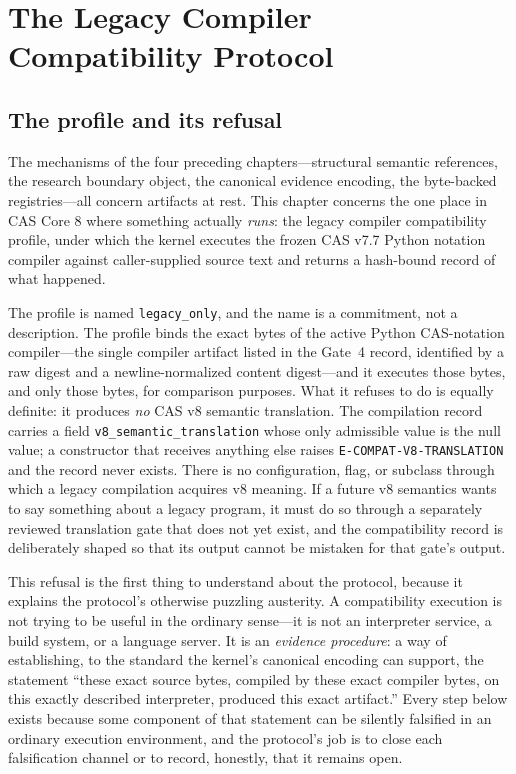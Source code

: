 \chapter{The Legacy Compiler Compatibility Protocol}\label{ch07:worker-protocol}

\section{The profile and its refusal}\label{ch07:profile}

The mechanisms of the four preceding chapters---structural semantic references, the research boundary object, the canonical evidence encoding, the byte-backed registries---all concern artifacts at rest. This chapter concerns the one place in CAS Core 8 where something actually \emph{runs}: the legacy compiler compatibility profile, under which the kernel executes the frozen CAS v7.7 Python notation compiler against caller-supplied source text and returns a hash-bound record of what happened.

The profile is named \texttt{legacy\_only}, and the name is a commitment, not a description. The profile binds the exact bytes of the active Python CAS-notation compiler---the single compiler artifact listed in the Gate~4 record, identified by a raw digest and a newline-normalized content digest---and it executes those bytes, and only those bytes, for comparison purposes. What it refuses to do is equally definite: it produces \emph{no} CAS v8 semantic translation. The compilation record carries a field \texttt{v8\_semantic\_translation} whose only admissible value is the null value; a constructor that receives anything else raises \texttt{E-COMPAT-V8-TRANSLATION} and the record never exists. There is no configuration, flag, or subclass through which a legacy compilation acquires v8 meaning. If a future v8 semantics wants to say something about a legacy program, it must do so through a separately reviewed translation gate that does not yet exist, and the compatibility record is deliberately shaped so that its output cannot be mistaken for that gate's output.

This refusal is the first thing to understand about the protocol, because it explains the protocol's otherwise puzzling austerity. A compatibility execution is not trying to be useful in the ordinary sense---it is not an interpreter service, a build system, or a language server. It is an \emph{evidence procedure}: a way of establishing, to the standard the kernel's canonical encoding can support, the statement ``these exact source bytes, compiled by these exact compiler bytes, on this exactly described interpreter, produced this exact artifact.'' Every step below exists because some component of that statement can be silently falsified in an ordinary execution environment, and the protocol's job is to close each falsification channel or to record, honestly, that it remains open.

